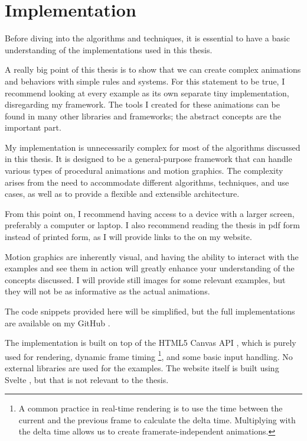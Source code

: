 \pagebreak

\section{Implementation}
\label{sec:implementation}

Before diving into the algorithms and techniques, it is essential to have a basic understanding of the implementations used in this thesis.

A really big point of this thesis is to show that we can create complex animations and behaviors with simple rules and systems. For this statement to be true, I recommend looking at every example as its own separate tiny implementation, disregarding my framework. The tools I created for these animations can be found in many other libraries and frameworks; the abstract concepts are the important part.

\begin{Note}
    My implementation is unnecessarily complex for most of the algorithms discussed in this thesis. It is designed to be a general-purpose framework that can handle various types of procedural animations and motion graphics. The complexity arises from the need to accommodate different algorithms, techniques, and use cases, as well as to provide a flexible and extensible architecture.
\end{Note}

From this point on, I recommend having access to a device with a larger screen, preferably a computer or laptop. I also recommend reading the thesis in pdf form instead of printed form, as I will provide links to the \examples on my website. 

Motion graphics are inherently visual, and having the ability to interact with the examples and see them in action will greatly enhance your understanding of the concepts discussed. I will provide still images for some relevant examples, but they will not be as informative as the actual animations.

\begin{Note}
    The code snippets provided here will be simplified, but the full implementations are available on my GitHub \repository.
\end{Note}

The implementation is built on top of the HTML5 Canvas API \cite{mdn-canvas-api}, which is purely used for rendering, dynamic frame timing \footnote{A common practice in real-time rendering is to use the time between the current and the previous frame to calculate the delta time. Multiplying with the delta time allows us to create framerate-independent animations.}, and some basic input handling. No external libraries are used for the examples. The website itself is built using Svelte \cite{svelte}, but that is not relevant to the thesis.


